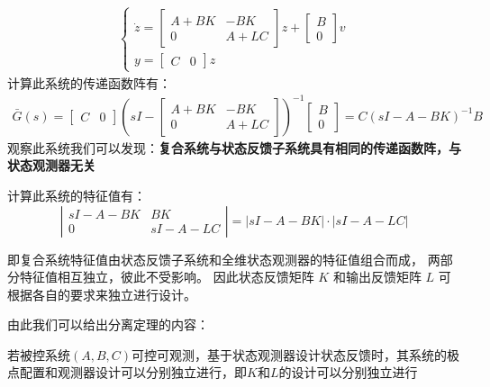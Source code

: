 \begin{align*}
    \begin{cases}
        \dot{z} = \begin{bmatrix}
            A+BK & -BK \\
            0 & A+LC
        \end{bmatrix} z + \begin{bmatrix}
            B \\ 0
        \end{bmatrix} v \\
        y = \begin{bmatrix}
            C & 0
        \end{bmatrix} z
    \end{cases}
\end{align*}
计算此系统的传递函数阵有：
\begin{align*}
    \bar{G}(s) = \begin{bmatrix} C & 0 \end{bmatrix}
    \left(
    sI -
    \begin{bmatrix}
    A + BK & -BK \\
    0 & A + LC
    \end{bmatrix}
    \right)^{-1}
    \begin{bmatrix}
    B \\
    0
    \end{bmatrix}
    =
    C(sI - A - BK)^{-1} B
\end{align*}
观察此系统我们可以发现：\textbf{复合系统与状态反馈子系统具有相同的传递函数阵，与状态观测器无关}

计算此系统的特征值有：
\[
\left|
\begin{array}{cc}
sI - A - BK & BK \\
0 & sI - A - LC
\end{array}
\right|
=
\left| sI - A - BK \right|
\cdot
\left| sI - A - LC \right|
\]

即复合系统特征值由状态反馈子系统和全维状态观测器的特征值组合而成，
两部分特征值相互独立，彼此不受影响。
因此状态反馈矩阵 $K$ 和输出反馈矩阵 $L$ 可根据各自的要求来独立进行设计。

由此我们可以给出分离定理的内容：
\begin{theorem}
    若被控系统$(A,B,C)$可控可观测，基于状态观测器设计状态反馈时，其系统的极点配置和观测器设计可以分别独立进行，即$K$和$L$的设计可以分别独立进行
\end{theorem}

